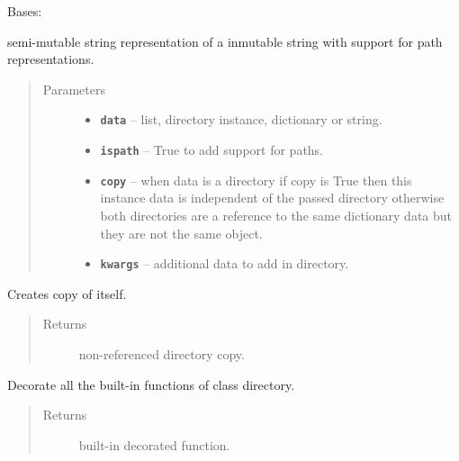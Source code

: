 \documentclass[letterpaper,10pt,english]{sphinxmanual}
\begin{document}
\begin{fulllineitems}
\label{RRtoolbox.lib:RRtoolbox.lib.directory.directory}
Bases: 

semi-mutable string representation of a inmutable string with support for path representations.
\begin{quote}\begin{description}
\item[{Parameters}] \leavevmode\begin{itemize}
\item {} 
\textbf{\texttt{data}} -- list, directory instance, dictionary or string.

\item {} 
\textbf{\texttt{ispath}} -- True to add support for paths.

\item {} 
\textbf{\texttt{copy}} -- when data is a directory if copy is True then this instance data is independent
of the passed directory otherwise both directories are a reference to the same
dictionary data but they are not the same object.

\item {} 
\textbf{\texttt{kwargs}} -- additional data to add in directory.

\end{itemize}

\end{description}\end{quote}

\begin{fulllineitems}
\label{RRtoolbox.lib:RRtoolbox.lib.directory.directory.copy}
Creates copy of itself.
\begin{quote}\begin{description}
\item[{Returns}] \leavevmode
non-referenced directory copy.

\end{description}\end{quote}

\end{fulllineitems}


\begin{fulllineitems}
\label{RRtoolbox.lib:RRtoolbox.lib.directory.directory.correctSTRBuiltin}
Decorate all the built-in functions of class directory.
\begin{quote}\begin{description}
\item[{Returns}] \leavevmode
built-in decorated function.


\end{description}
\end{quote}
\end{fulllineitems}
\end{fulllineitems}
\end{document}
